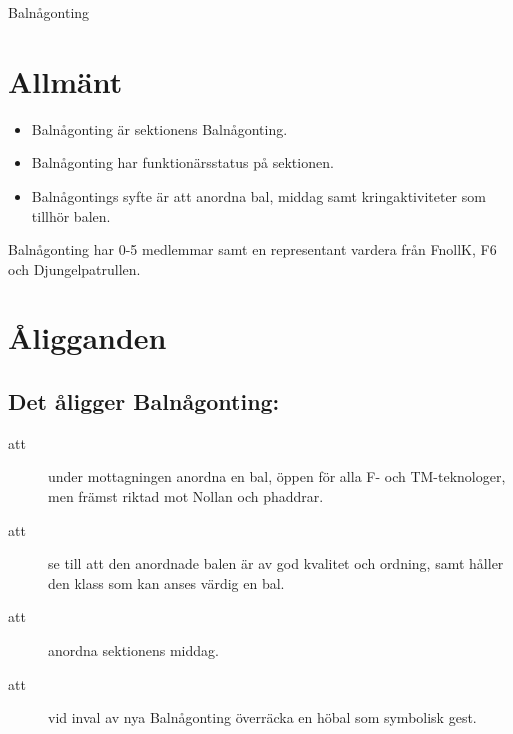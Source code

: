 \documentclass[a4paper]{article}
\begin{document}
\renewcommand{\forening}{Balnågonting} %

\begin{foreningenv}{\forening{}} %
    \section{Allmänt}
    \begin{itemize}
        \item Balnågonting är sektionens Balnågonting.
        \item Balnågonting har funktionärsstatus på sektionen.
        \item Balnågontings syfte är att anordna bal, middag samt kringaktiviteter som tillhör balen.
    \end{itemize}
    Balnågonting har 0-5 medlemmar samt en representant vardera från FnollK, F6 och Djungelpatrullen.
    
    \section{Åligganden}
    \aliggsektfunkt{} %
        
    \subsection{Det åligger \forening{}:}
    \begin{description}
          \item[att] under mottagningen anordna en bal, öppen för alla F- och TM-teknologer, men främst riktad mot Nollan och phaddrar.
          \item[att] se till att den anordnade balen är av god kvalitet och ordning, samt håller den klass som kan anses värdig en bal.
          \item[att] anordna sektionens middag.
          \item[att] vid inval av nya Balnågonting överräcka en höbal som symbolisk gest.
    \end{description}
\end{foreningenv}
\end{document}
